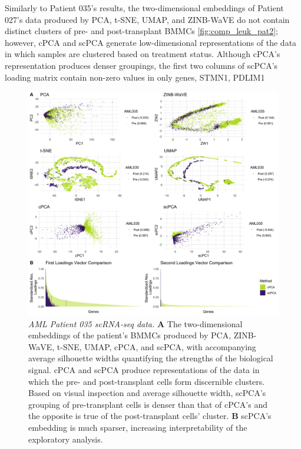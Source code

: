 Similarly to Patient 035's results, the two-dimensional embeddings of Patient 027's data produced by PCA, t-SNE, UMAP,  and ZINB-WaVE do not contain distinct clusters of pre- and post-transplant BMMCs \ref{fig:comp_leuk_pat2}; however, cPCA and scPCA generate low-dimensional representations of the data in which samples are clustered based on treatment status. Although cPCA's representation produces denser groupings, the first two columns of scPCA's loading matrix contain non-zero values in only  genes, STMN1,  PDLIM1

\FloatBarrier
\begin{figure}[!htbp]
  \centering
  \includegraphics[width = \textwidth]{figures/aml035_results}
  \caption{{\em AML Patient 035 scRNA-seq data.} 
  \textbf{A} The two-dimensional embeddings of the patient's BMMCs produced by PCA, ZINB-WaVE, t-SNE, UMAP, cPCA, and scPCA, with accompanying average silhouette widths quantifying the strengths of the biological signal. cPCA and scPCA produce representations of the data in which the pre- and post-transplant cells form discernible clusters. Based on visual inspection and average silhouette width, scPCA's grouping of pre-transplant cells is denser than that of cPCA's and the opposite is true of the post-transplant cells' cluster. \textbf{B} scPCA's embedding is much sparser, increasing interpretability of the exploratory analysis.}
  \label{fig:comp_leuk_pat1}
\end{figure}